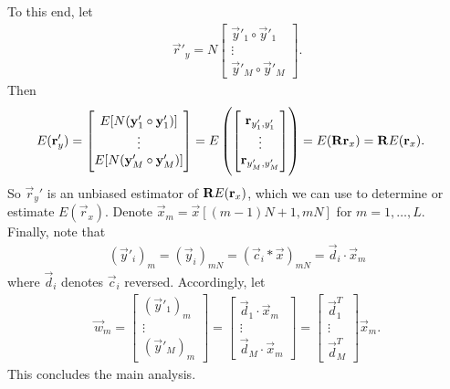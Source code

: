 \documentclass[a4paper, openany, oneside]{memoir}
\begin{document}
To this end, let
\begin{align*}
    \vec{r}'_y = N \begin{bmatrix}
        \vec{y}'_1 \circ \vec{y}'_1 \\
        \vdots \\
        \vec{y}'_M \circ \vec{y}'_M
    \end{bmatrix}.
\end{align*}
Then
\begin{align*}
    E(\boldsymbol{\mathbf{r}}'_y) &= \begin{bmatrix}
        E[N(\boldsymbol{\mathbf{y}}'_1 \circ \boldsymbol{\mathbf{y}}'_1)] \\
        \vdots \\
        E[N(\boldsymbol{\mathbf{y}}'_M \circ \boldsymbol{\mathbf{y}}'_M)]
    \end{bmatrix}
    = E\left(\begin{bmatrix}
        \boldsymbol{\mathbf{r}}_{y'_1,y'_1} \\
        \vdots \\
        \boldsymbol{\mathbf{r}}_{y'_M,y'_M} \\
    \end{bmatrix}\right) = E(\boldsymbol{\mathbf{R}} \boldsymbol{\mathbf{r}}_x) = \boldsymbol{\mathbf{R}} E(\boldsymbol{\mathbf{r}}_x).
\end{align*}
So $\vec{r}_y'$ is an unbiased estimator of $\boldsymbol{\mathbf{R}} E(\boldsymbol{\mathbf{r}}_x)$, which we can use to determine or estimate $E(\vec{r}_x)$. Denote $\vec{x}_m = \vec{x}[(m-1)N+1,mN]$ for $m = 1,\ldots,L$. Finally, note that
\begin{align*}
    (\vec{y}'_i)_m = (\vec{y}_i)_{mN} = (\vec{c}_i \ast \vec{x})_{mN} = \vec{d}_i \cdot \vec{x}_m
\end{align*}
where $\vec{d}_i$ denotes $\vec{c}_i$ reversed. Accordingly, let
\begin{align*}
    \vec{w}_m = \begin{bmatrix}
        (\vec{y}'_1)_m \\
        \vdots \\
        (\vec{y}'_M)_m
    \end{bmatrix} = \begin{bmatrix}
        \vec{d}_1 \cdot \vec{x}_m \\
        \vdots \\
        \vec{d}_M \cdot \vec{x}_m
    \end{bmatrix} = \begin{bmatrix}
        \vec{d}_1^T\\
        \vdots \\
        \vec{d}_M^T
    \end{bmatrix} \vec{x}_m.
\end{align*}
This concludes the main analysis.
\end{document}
